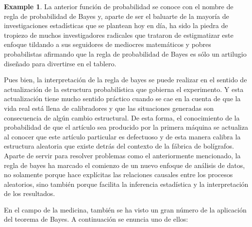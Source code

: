 \documentclass[
  spanish,
  letter]{book}
\theoremstyle{definition}
\theoremstyle{definition}
\newtheorem{example}{Example}[chapter]
\theoremstyle{definition}
\theoremstyle{remark}
\begin{document}
\begin{example}
La anterior función de probabilidad se conoce con el nombre de regla de probabilidad de Bayes y, aparte de ser el baluarte de la mayoría de investigaciones estadísticas que se plantean hoy en día, ha sido la piedra de tropiezo de muchos investigadores radicales que trataron de estigmatizar este enfoque tildando a sus seguidores de mediocres matemáticos y pobres probabilistas afirmando que la regla de probabilidad de Bayes es sólo un artilugio diseñado para divertirse en el tablero.

Pues bien, la interpretación de la regla de bayes se puede realizar en el sentido de actualización de la estructura probabilística que gobierna el experimento. Y esta actualización tiene mucho sentido práctico cuando se cae en la cuenta de que la vida real está llena de calibradores y que las situaciones generadas son consecuencia de algún cambio estructural. De esta forma, el conocimiento de la probabilidad de que el artículo sea producido por la primera máquina se actualiza al conocer que este artículo particular es defectuoso y de esta manera calibra la estructura aleatoria que existe detrás del contexto de la fábrica de bolígrafos. Aparte de servir para resolver problemas como el anteriormente mencionado, la regla de bayes ha marcado el comienzo de un nuevo enfoque de análisis de datos, no solamente porque hace explícitas las relaciones causales entre los procesos aleatorios, sino también porque facilita la inferencia estadística y la interpretación de los resultados.
\end{example}

En el campo de la medicina, también se ha visto un gran número de la aplicación del teorema de Bayes. A continuación se enuncia uno de ellos:
\end{document}

